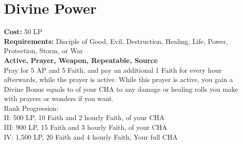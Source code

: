 \section{Divine Power}\label{prayer:divinePower}
\textbf{Cost:} 50 LP\\
\textbf{Requirements:} Disciple of Good, Evil, Destruction, Healing, Life, Power, Protection, Storm, or War\\
\textbf{Active, Prayer, Weapon, Repeatable, Source}\\
Pray for 5 AP and 5 Faith, and pay an additional 1 Faith for every hour afterwards, while the prayer is active.
While this prayer is active, you gain a Divine Bonus equals to  of your CHA to any damage or healing rolls you make with prayers or wonders if you want.
\\
Rank Progression:\\
II: 500 LP, 10 Faith and 2 hourly Faith,  of your CHA\\
III: 900 LP, 15 Faith and 3 hourly Faith,  of your CHA\\
IV: 1,500 LP, 20 Faith and 4 hourly Faith, Your full CHA\\